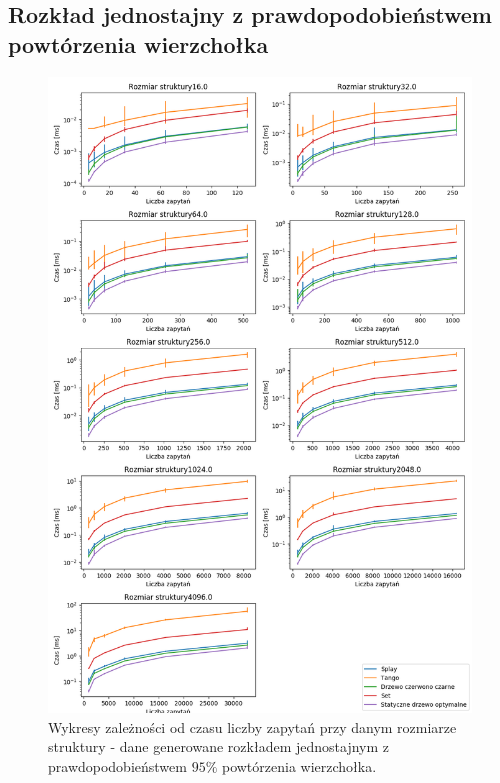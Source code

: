 \documentclass[declaration,shortabstract]{iithesis}
\theoremstyle{thm}
\theoremstyle{remark}
\theoremstyle{plain}
\theoremstyle{plain}
\theoremstyle{plain}
\begin{document}
\subsection{Rozkład jednostajny z prawdopodobieństwem powtórzenia wierzchołka}
\begin{figure}[H]  

\centering
    \includegraphics[scale=0.5]{wykresy/uniform5.png}
      \caption{Wykresy zależności od czasu liczby zapytań przy danym rozmiarze struktury - dane generowane rozkładem jednostajnym z prawdopodobieństwem  \(95\%\) powtórzenia wierzchołka. }  
    \label{fig:zigzig} 
\end{figure}
\end{document}
